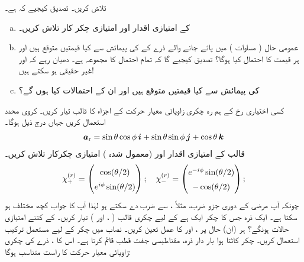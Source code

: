  تلاش کریں۔  تصدیق  کیجیے  کہ     ہے۔ 
 \begin{enumerate}[a.]
\item
     کے امتیازی  اقدار اور امتیازی چکر کار  تلاش  کریں۔
\item
 عمومی حال  ( مساوات  )   میں پائے جانے والے  ذرے کے    کی پیمائش سے کیا قیمتیں متوقع  ہیں اور ہر قیمت کا احتمال کیا ہوگا؟  تصدیق کیجیے  گا کہ تمام احتمال کا مجموعہ    ہے۔  دھیان رہے کہ   اور   غیر حقیقی   ہو سکتے ہیں!  
\item
  کی پیمائش سے کیا قیمتیں متوقع ہیں اور ان کے احتمالات کیا ہوں گے؟ 
\end{enumerate}
کسی اختیاری رخ  کے ہم رہ چکری زاویائی معیار حرکت کے اجزاء کا  قالب    تیار کریں۔ کروی محدد استعمال کریں جہاں درج ذیل ہوگا۔
\begin{align}
{\boldsymbol{a}}_{\textup{r}}= \sin\theta \cos\phi\, {\boldsymbol{i}} + \sin\theta \sin\phi \, {\boldsymbol{j}} + \cos\theta \, {\boldsymbol{k}}
\end{align}
 قالب  کے  امتیازی  اقدار  اور (معمول شدہ  ) امتیازی  چکرکار  تلاش کریں۔ 
\begin{align}
\renewcommand{\arraystretch}{1.5}
\chi_{+}^{(r)} = \begin{pmatrix} \cos(\theta/2)\\ e^{i\phi}\sin(\theta/2)\end{pmatrix};
\quad
\chi_{-}^{(r)} = \begin{pmatrix} e^{-i\phi}\sin(\theta/2)\\ -\cos(\theta/2)\end{pmatrix};
\end{align}
چونکہ آپ  مرضی کے دوری جزو ضرب، مثلاً    ،  سے ضرب دے سکتے ہو لہٰذا   آپ کا جواب کچھ مختلف ہو سکتا ہے۔ 
ایک  ذرہ جس کا چکر ایک  ہے کے لیے چکری  قالب (  ،      اور ) تیار کریں۔     
کے کتنے امتیازی حالات ہونگے؟  ہر (ان) حال پر   ،   اور  کا عمل تعین  کریں۔ نصاب میں   چکر کے لیے مستعمل  ترکیب استعمال کریں۔
 چکر کاٹتا ہوا بار دار    ذرہ،  مقناطیسی جفت  قطب   قائم کرتا ہے۔ اس کا   ، ذرے کی چکری زاویائی معیار حرکت  کا  راست متناسب ہوگا:
